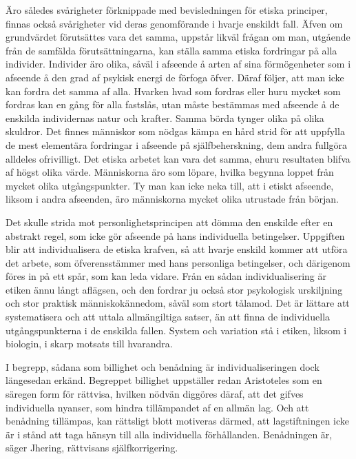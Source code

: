 \documentclass[12pt]{article}
\newcommand{\opage}[1]{\marginnote{\footnotesize\textit{[#1]}}}
\begin{document}
Äro således svårigheter förknippade med bevisledningen för etiska principer, finnas också svårigheter vid deras genomförande i hvarje enskildt fall. Äfven om grundvärdet förutsättes vara det samma, uppstår likväl frågan om man, utgående från de samfälda förutsättningarna, kan ställa samma etiska fordringar på alla individer. Individer äro olika, såväl i afseende å arten af sina förmögenheter som i afseende å den grad af psykisk energi de förfoga öfver. Däraf följer, att man icke kan fordra det samma af alla. Hvarken hvad som fordras eller huru mycket som fordras kan en gång för alla fastslås, utan måste bestämmas med afseende å de enskilda individernas natur och krafter. Samma börda tynger olika på olika skuldror. Det finnes människor som nödgas kämpa en hård strid för att uppfylla de mest elementära fordringar i afseende på själfbeherskning, dem andra fullgöra alldeles ofrivilligt. Det etiska arbetet kan vara det samma, ehuru resultaten blifva af högst olika värde. Människorna äro som löpare, hvilka begynna loppet från mycket olika utgångspunkter. %
\opage{57}
Ty man kan icke neka till, att i etiskt afseende, liksom i andra afseenden, äro människorna mycket olika utrustade från början.

Det skulle strida mot personlighetsprincipen att dömma den enskilde efter en abstrakt regel, som icke gör afseende på hans individuella betingelser. Uppgiften blir att individualisera de etiska krafven, så att hvarje enskild kommer att utföra det arbete, som öfverensstämmer med hans personliga betingelser, och därigenom föres in på ett spår, som kan leda vidare. Från en sådan individualisering är etiken ännu långt aflägsen, och den fordrar ju också stor psykologisk urskiljning och stor praktisk människokännedom, såväl som stort tålamod. Det är lättare att systematisera och att uttala allmängiltiga satser, än att finna de individuella utgångspunkterna i de enskilda fallen. System och variation stå i etiken, liksom i biologin, i skarp motsats till hvarandra.

I begrepp, sådana som billighet och benådning är individualiseringen dock längesedan erkänd. Begreppet billighet uppställer redan Aristoteles som en säregen form för rättvisa, hvilken nödvän%
\opage{58}
diggöres däraf, att det gifves individuella nyanser, som hindra tillämpandet af en allmän lag. Och att benådning tillämpas, kan rättsligt blott motiveras därmed, att lagstiftningen icke är i stånd att taga hänsyn till alla individuella förhållanden. Benådningen är, säger Jhering, rättvisans själfkorrigering.
\end{document}
